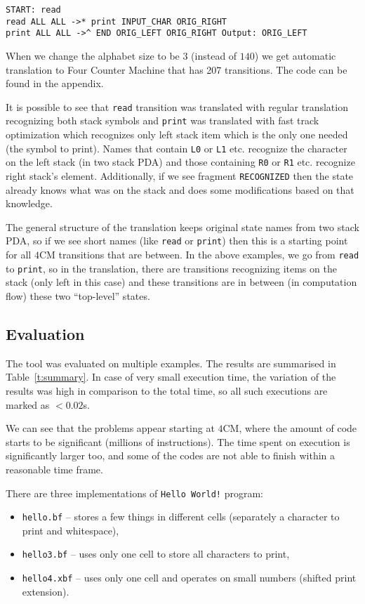 \documentclass[english,shortabstract,mgr]{iithesis}
\begin{document}
\begin{verbatim}
START: read
read ALL ALL ->* print INPUT_CHAR ORIG_RIGHT
print ALL ALL ->^ END ORIG_LEFT ORIG_RIGHT Output: ORIG_LEFT
\end{verbatim}

When we change the alphabet size to be $3$ (instead of $140$) we get
automatic translation to Four Counter Machine that has 207 transitions.
The code can be found in the appendix.

It is possible to see that \texttt{read} transition was translated with
regular translation recognizing both stack symbols and \texttt{print}
was translated with fast track optimization which recognizes only
left stack item which is the only one needed (the symbol to print).
Names that contain \texttt{L0} or \texttt{L1} etc. recognize the character
on the left stack (in two stack PDA) and those containing \texttt{R0}
or \texttt{R1} etc. recognize right stack's element. Additionally, if
we see fragment \texttt{RECOGNIZED} then the state already knows what
was on the stack and does some modifications based on that knowledge.

The general structure of the translation keeps original state names from
two stack PDA, so if we see short names (like \texttt{read} or \texttt{print})
then this is a starting point for all $4$CM transitions that are between.
In the above examples, we go from \texttt{read} to \texttt{print}, so in
the translation, there are transitions recognizing items on the stack (only left in
this case) and these transitions are in between (in computation flow) these two ``top-level'' states.

\subsection{Evaluation}

The tool was evaluated on multiple examples. The results are summarised
in Table~\ref{t:summary}. In case of very small execution time, the variation
of the results was high in comparison to the total time, so all such executions
are marked as $<0.02$s.

We can see that the problems appear starting at $4$CM, where
the amount of code starts to be significant (millions of instructions).
The time spent on execution is significantly larger too,
and some of the codes are not able to finish within a reasonable time frame.

There are three implementations of \texttt{Hello World!} program:
\begin{itemize}
  \item \texttt{hello.bf} -- stores a few things in different cells
      (separately a character to print and whitespace),
  \item \texttt{hello3.bf} -- uses only one cell to store all characters to print,
  \item \texttt{hello4.xbf} -- uses only one cell and operates on small numbers
      (shifted print extension).
\end{itemize}
\end{document}
